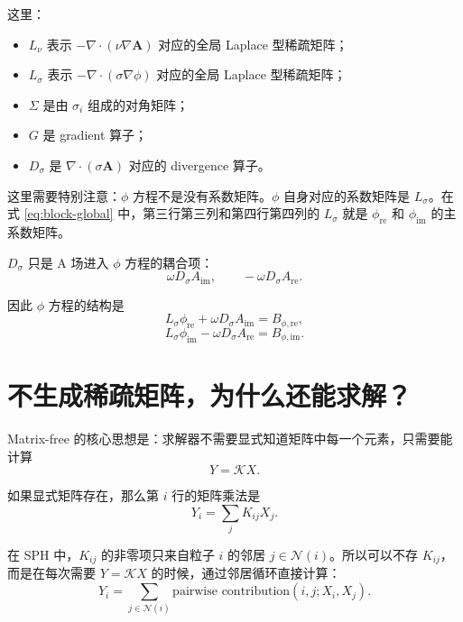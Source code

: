 \documentclass[UTF8,11pt]{ctexart}
\begin{document}
这里：
\begin{itemize}
    \item $L_{\nu}$ 表示 $-\nabla\cdot(\nu\nabla \bm A)$ 对应的全局 Laplace 型稀疏矩阵；
    \item $L_{\sigma}$ 表示 $-\nabla\cdot(\sigma\nabla\phi)$ 对应的全局 Laplace 型稀疏矩阵；
    \item $\Sigma$ 是由 $\sigma_i$ 组成的对角矩阵；
    \item $G$ 是 gradient 算子；
    \item $D_{\sigma}$ 是 $\nabla\cdot(\sigma\bm A)$ 对应的 divergence 算子。
\end{itemize}

这里需要特别注意：$\phi$ 方程不是没有系数矩阵。$\phi$ 自身对应的系数矩阵是 $L_{\sigma}$。在式 \eqref{eq:block-global} 中，第三行第三列和第四行第四列的 $L_{\sigma}$ 就是 $\phi_{\mathrm{re}}$ 和 $\phi_{\mathrm{im}}$ 的主系数矩阵。

$D_{\sigma}$ 只是 A 场进入 $\phi$ 方程的耦合项：
\begin{equation}
    \omega D_{\sigma}A_{\mathrm{im}},
    \qquad
    -\omega D_{\sigma}A_{\mathrm{re}}.
\end{equation}

因此 $\phi$ 方程的结构是
\begin{equation}
    L_{\sigma}\phi_{\mathrm{re}}
    +
    \omega D_{\sigma}A_{\mathrm{im}}
    =
    B_{\phi,\mathrm{re}},
\end{equation}
\begin{equation}
    L_{\sigma}\phi_{\mathrm{im}}
    -
    \omega D_{\sigma}A_{\mathrm{re}}
    =
    B_{\phi,\mathrm{im}}.
\end{equation}

\section{不生成稀疏矩阵，为什么还能求解？}

Matrix-free 的核心思想是：求解器不需要显式知道矩阵中每一个元素，只需要能计算
\begin{equation}
    Y = \mathcal{K}X .
\end{equation}

如果显式矩阵存在，那么第 $i$ 行的矩阵乘法是
\begin{equation}
    Y_i
    =
    \sum_j K_{ij}X_j .
\end{equation}

在 SPH 中，$K_{ij}$ 的非零项只来自粒子 $i$ 的邻居 $j\in\mathcal{N}(i)$。所以可以不存 $K_{ij}$，而是在每次需要 $Y=\mathcal{K}X$ 的时候，通过邻居循环直接计算：
\begin{equation}
    Y_i
    =
    \sum_{j\in\mathcal{N}(i)}
    \text{pairwise contribution}(i,j;X_i,X_j).
\end{equation}
\end{document}
